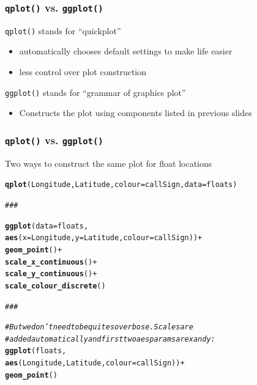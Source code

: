 \documentclass{beamer}\usepackage[]{graphicx}\usepackage[]{color}
\makeatletter
\newcommand{\hlcom}[1]{\textcolor[rgb]{0.678,0.584,0.686}{\textit{#1}}}%
\newcommand{\hlopt}[1]{\textcolor[rgb]{0,0,0}{#1}}%
\newcommand{\hlstd}[1]{\textcolor[rgb]{0.345,0.345,0.345}{#1}}%
\newcommand{\hlkwc}[1]{\textcolor[rgb]{0.333,0.667,0.333}{#1}}%
\newcommand{\hlkwd}[1]{\textcolor[rgb]{0.737,0.353,0.396}{\textbf{#1}}}%
\newenvironment{kframe}{%
 \def\at@end@of@kframe{}%
 \ifinner\ifhmode%
  \def\at@end@of@kframe{\end{minipage}}%
  \begin{minipage}{\columnwidth}%
 \fi\fi%
 \def\FrameCommand##1{\hskip\@totalleftmargin \hskip-\fboxsep
 \colorbox{shadecolor}{##1}\hskip-\fboxsep
     \hskip-\linewidth \hskip-\@totalleftmargin \hskip\columnwidth}%
 \MakeFramed {\advance\hsize-\width
   \@totalleftmargin\z@ \linewidth\hsize
   \@setminipage}}%
 {\par\unskip\endMakeFramed%
 \at@end@of@kframe}
\newenvironment{knitrout}{}{} %
\makeatother
\begin{document}

\begin{frame}[fragile]
\frametitle{\texttt{qplot()} vs. \texttt{ggplot()}}
\texttt{qplot()} stands for ``quickplot'' \medskip
\begin{itemize}
  \item automatically chooses default settings to make life easier\medskip
  \item less control over plot construction\bigskip
\end{itemize} 
    
\texttt{ggplot()} stands for ``grammar of graphics plot'' \medskip
\begin{itemize}
  \item Constructs the plot using components listed in previous slides
\end{itemize} 
\end{frame}



\begin{frame}[fragile]
\frametitle{\texttt{qplot()} vs. \texttt{ggplot()}}
Two ways to construct the same plot for float locations 
\begin{knitrout}\footnotesize
{}\color{fgcolor}\begin{kframe}
\begin{alltt}
\hlkwd{qplot}\hlstd{(Longitude, Latitude,} \hlkwc{colour}\hlstd{=callSign,} \hlkwc{data}\hlstd{=floats)}

\hlcom{###}

\hlkwd{ggplot}\hlstd{(}\hlkwc{data}\hlstd{=floats,}
       \hlkwd{aes}\hlstd{(}\hlkwc{x}\hlstd{=Longitude,} \hlkwc{y}\hlstd{=Latitude,} \hlkwc{colour}\hlstd{=callSign))} \hlopt{+}
  \hlkwd{geom_point}\hlstd{()} \hlopt{+}
  \hlkwd{scale_x_continuous}\hlstd{()} \hlopt{+}
  \hlkwd{scale_y_continuous}\hlstd{()} \hlopt{+}
  \hlkwd{scale_colour_discrete} \hlstd{()}

\hlcom{###}

\hlcom{# But we don't need to be quite so verbose.  Scales are}
\hlcom{# added automatically and first two aes params are x and y:}
\hlkwd{ggplot}\hlstd{(floats,}
       \hlkwd{aes}\hlstd{(Longitude, Latitude,} \hlkwc{colour} \hlstd{= callSign))} \hlopt{+}
  \hlkwd{geom_point}\hlstd{()}
\end{alltt}
\end{kframe}
\end{knitrout}

\end{frame}
\end{document}
